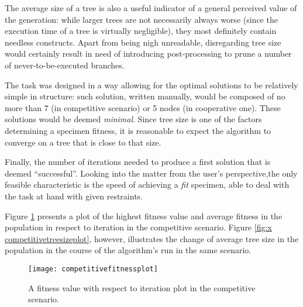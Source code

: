 The average size of a tree is also a useful indicator of a general perceived value of the generation: while larger trees are not necessarily always worse (since the execution time of a tree is virtually negligible), they most definitely contain needless constructs. Apart from being nigh unreadable, disregarding tree size would certainly result in need of introducing post-processing to prune a number of never-to-be-executed branches.

The task was designed in a way allowing for the optimal solutions to be relatively simple in structure: such solution, written manually, would be composed of no more than 7 (in competitive scenario) or 5 nodes (in cooperative one). These solutions would be deemed \textit{minimal}. Since tree size is one of the factors determining a specimen fitness, it is reasonable to expect the algorithm to converge on a tree that is close to that size.

Finally, the number of iterations needed to produce a first solution that is deemed ``successful''. Looking into the matter from the user's perspective,the only feasible characteristic is the speed of achieving a \textit{fit} specimen, able to deal with the task at hand with given restraints.

Figure \ref{fig:x competitivefitnessplot} presents a plot of the highest fitness value and average fitness in the population in respect to iteration in the competitive scenario. Figure \ref{fig:x competitivetreesizeplot}, however, illustrates the change of average tree size in the population in the course of the algorithm's run in the same scenario.

\begin{figure}[h]
    \centering
    \texttt{[image: competitivefitnessplot]}
    \caption{A fitness value with respect to iteration plot in the competitive scenario.}
    \label{fig:x competitivefitnessplot}
\end{figure}

